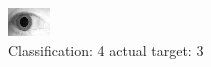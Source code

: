 \begin{figure}[h!]
\begin{center}
\includegraphics[width=0.60\columnwidth]{figures/ID1880_class_4_target_3.png}
\end{center}
\caption{ Classification: 4 actual target: 3}
\label{fig:ID1880_class_4_target_3}
\end{figure}

